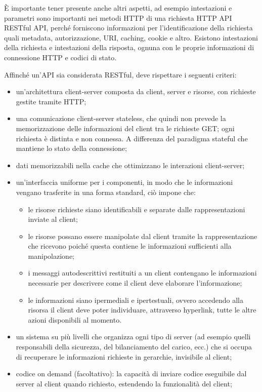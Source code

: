 \documentclass[12pt,a4paper]{article}
\begin{document}
È importante tener presente anche altri aspetti, ad esempio intestazioni e parametri sono importanti nei metodi HTTP di una richiesta HTTP API RESTful API, perché forniscono informazioni per l'identificazione della richiesta quali metadata, autorizzazione, URI, caching, cookie e altro. Esistono intestazioni della richiesta e intestazioni della risposta, ognuna con le proprie informazioni di connessione HTTP e codici di stato.

Affinché un'API sia considerata RESTful, deve rispettare i seguenti criteri:
\begin{itemize}
    \item un'architettura client-server composta da client, server e risorse, con richieste gestite tramite HTTP;
    \item una comunicazione client-server stateless, che quindi non prevede la memorizzazione delle informazioni del client tra le richieste GET; ogni richiesta è distinta e non connessa. A differenza del paradigma stateful che mantiene lo stato della connessione;
    \item dati memorizzabili nella cache che ottimizzano le interazioni client-server;
    \item un'interfaccia uniforme per i componenti, in modo che le informazioni vengano trasferite in una forma standard, ciò impone che:
        \begin{itemize}
            \item le risorse richieste siano identificabili e separate dalle rappresentazioni inviate al client;
            \item le risorse possano essere manipolate dal client tramite la rappresentazione che ricevono poiché questa contiene le informazioni sufficienti alla manipolazione;
            \item i messaggi autodescrittivi restituiti a un client contengano le informazioni necessarie per descrivere come il client deve elaborare l'informazione;
            \item le informazioni siano ipermediali e ipertestuali, ovvero accedendo alla risorsa il client deve poter individuare, attraverso hyperlink, tutte le altre azioni disponibili al momento.
        \end{itemize}
    \item un sistema su più livelli che organizza ogni tipo di server (ad esempio quelli responsabili della sicurezza, del bilanciamento del carico, ecc.) che si occupa di recuperare le informazioni richieste in gerarchie, invisibile al client;
    \item codice on demand (facoltativo): la capacità di inviare codice eseguibile dal server al client quando richiesto, estendendo la funzionalità del client;
\end{itemize}
\end{document}
